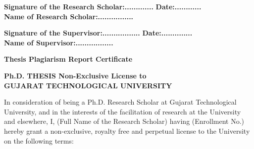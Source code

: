 \vspace{1cm}

\textbf{Signature of the Research Scholar:.............} \hspace{4cm} \textbf{Date:............}\\[0.5cm]
\textbf{Name of Research Scholar:................} \\[0.5cm]

\vspace{1cm}

\textbf{Signature of the Supervisor:.................} \hspace{5.5cm} \textbf{Date:..............}\\[0.5cm]
\textbf{Name of Supervisor:.................} \\[0.5cm]


\newpage

\begin{center}
	\Large	\textbf{Thesis Plagiarism Report Certificate}
\end{center}


\newpage

\begin{center}
	\Large	\textbf{Ph.D. THESIS Non-Exclusive License to\\GUJARAT TECHNOLOGICAL UNIVERSITY}
\end{center}


In consideration of being a Ph.D. Research Scholar at Gujarat Technological University, and in the interests of the facilitation of research at the University and elsewhere, I, (Full Name of the Research Scholar) having (Enrollment No.)  hereby grant a non-exclusive, royalty free and perpetual license to the University on the following terms: 

\vspace{1cm}

